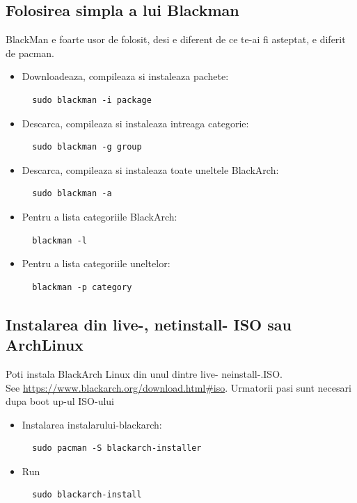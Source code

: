\documentclass[a4paper, oneside, 11pt]{book}
\begin{document}
\subsection{Folosirea simpla a lui Blackman} BlackMan e foarte usor de folosit, desi e diferent de ce te-ai fi asteptat, e diferit de pacman.
\begin{itemize}
\item Downloadeaza, compileaza si instaleaza pachete:
\begin{lstlisting}
  sudo blackman -i package
\end{lstlisting}

\item Descarca, compileaza si instaleaza intreaga categorie:
\begin{lstlisting}
  sudo blackman -g group
\end{lstlisting}

\item Descarca, compileaza si instaleaza toate uneltele BlackArch:
\begin{lstlisting}
  sudo blackman -a
\end{lstlisting}

\item Pentru a lista categoriile BlackArch:
\begin{lstlisting}
  blackman -l
\end{lstlisting}

\item Pentru a lista categoriile uneltelor:
\begin{lstlisting}
  blackman -p category
\end{lstlisting}

\end{itemize}

\subsection{Instalarea din  live-, netinstall- ISO sau ArchLinux}
Poti instala BlackArch Linux din unul dintre live- neinstall-.ISO.\\See
\url{https://www.blackarch.org/download.html#iso}. Urmatorii pasi sunt necesari dupa boot up-ul ISO-ului
\begin{itemize}
\item Instalarea instalarului-blackarch:
\begin{lstlisting}
  sudo pacman -S blackarch-installer
\end{lstlisting}

\item Run
\begin{lstlisting}
  sudo blackarch-install
\end{lstlisting}

\end{itemize}
\end{document}
